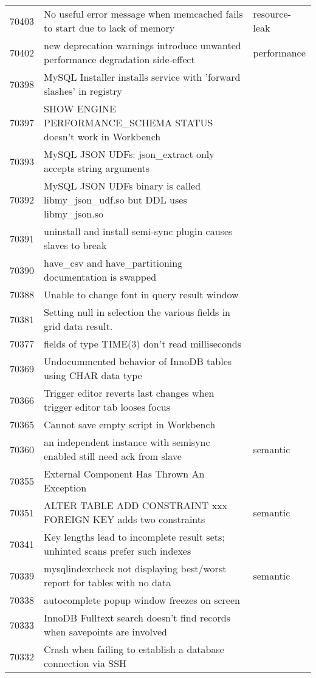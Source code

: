\begin{longtable}[c]{p{1cm}p{10cm}p{1cm}}
70403 & No useful error message when memcached fails to start due to lack of memory & resource-leak \\
70402 & new deprecation warnings introduce unwanted performance degradation side-effect & performance \\
70398 & MySQL Installer installs service with 'forward slashes' in registry &  \\
70397 & SHOW ENGINE PERFORMANCE\_SCHEMA STATUS doesn't work in Workbench &  \\
70393 & MySQL JSON UDFs: json\_extract only accepts string arguments &  \\
70392 & MySQL JSON UDFs binary is called libmy\_json\_udf.so but DDL uses libmy\_json.so &  \\
70391 & uninstall and install semi-sync plugin causes slaves to break &  \\
70390 & have\_csv and have\_partitioning documentation is swapped &  \\
70388 & Unable to change font in query result window &  \\
70381 & Setting null in selection the various fields in grid data result. &  \\
70377 & fields of type TIME(3) don't read milliseconds &  \\
70369 & Undocummented behavior of InnoDB tables using CHAR data type &  \\
70366 & Trigger editor reverts last changes when trigger editor tab looses focus &  \\
70365 & Cannot save empty script in Workbench &  \\
70360 & an independent instance with semisync enabled still need ack from slave & semantic \\
70355 & External Component Has Thrown An Exception &  \\
70351 & ALTER TABLE ADD CONSTRAINT xxx FOREIGN KEY adds two constraints & semantic \\
70341 & Key lengths lead to incomplete result sets; unhinted scans prefer such indexes &  \\
70339 & mysqlindexcheck not displaying best/worst report for tables with no data & semantic \\
70338 & autocomplete popup window freezes on screen &  \\
70333 & InnoDB Fulltext search doesn't find records when savepoints are involved &  \\
70332 & Crash when failing to establish a database connection via SSH &  \\

\end{longtable}
